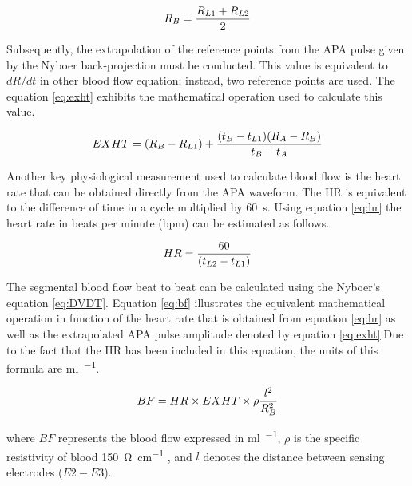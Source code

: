
\begin{align}
	\label{eq:RB}
	R_B = \frac{R_{L1}+R_{L2}}{2} \tagaddtext{[\si{\Omega}]}
\end{align}

Subsequently, the extrapolation of the reference points from the APA pulse given by the Nyboer back-projection \cite{montgomery2011segmental} must be conducted. This value is equivalent to $dR/dt$ in other blood flow equation; instead, two reference points are used. The equation \ref{eq:exht} exhibits the mathematical operation used to calculate this value.

\begin{align}
	\label{eq:exht}
	EXHT = (R_{B}-R_{L1}) + \frac{(t_{B}-t_{L1})(R_{A}-R_{B})}{t_{B}-t_{A}} \tagaddtext{[\si{\Omega}]}
\end{align}

Another key physiological measurement used to calculate blood flow is the heart rate that can be obtained directly from the APA waveform. The HR is equivalent to the difference of time in a cycle multiplied by \SI{60}{\second}. Using equation \ref{eq:hr} the heart rate in beats per minute (\si{bpm}) can be estimated as follows.

\begin{align}
	\label{eq:hr}
	HR = \frac{60}{(t_{L2}-t_{L1})}  \tagaddtext{[\si{bpm}]}
\end{align}

The segmental blood flow beat to beat can be calculated using the Nyboer's equation \ref{eq:DVDT}. Equation \ref{eq:bf} illustrates the equivalent mathematical operation in function of the heart rate that is obtained from equation \ref{eq:hr} as well as the extrapolated APA pulse amplitude denoted by equation \ref{eq:exht}.Due to the fact that the HR has been included in this equation, the units of this formula are \si{\milli\litre\per\min}. 

\begin{align}
	\label{eq:bf}
	BF = HR \times EXHT \times \rho \frac{l^2}{R_B^2} \tagaddtext{[\si{\ml\per\min}]}
\end{align}

where $BF$ represents the blood flow expressed in \si{\milli\litre\per\min}, $\rho$ is the specific resistivity of blood \SI{150}{\ohm\per\cm} \cite{nyober1950electrical, mohapatra1981non}, and $l$ denotes the distance between sensing electrodes ($E2 - E3$).

